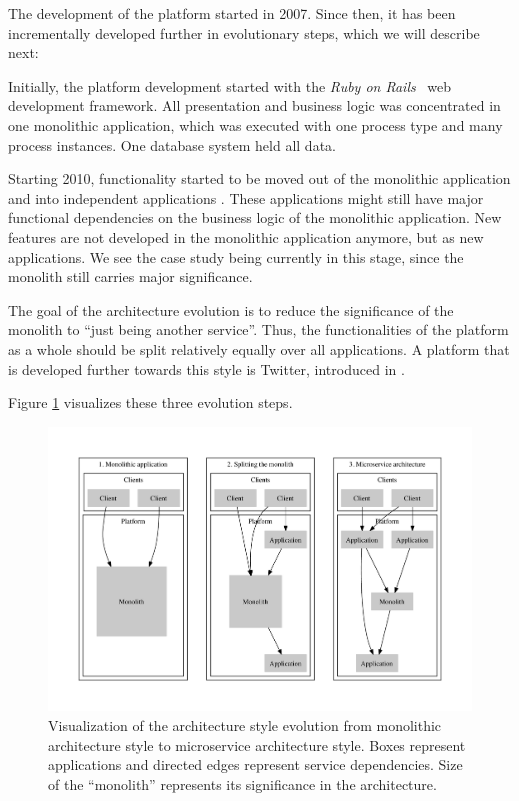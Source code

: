 The development of the platform started in 2007. Since then, it has been incrementally developed further in evolutionary steps, which we will describe next:
\begin{tdescription}
  \item[1. Monolithic application] Initially, the platform development started with the \emph{Ruby on Rails}~\cite{Rails} web development framework. All presentation and business logic was concentrated in one monolithic application, which was executed with one process type and many process instances. One database system held all data.
  \item[2. Splitting the monolithic application] Starting 2010, functionality started to be moved out of the monolithic application and into independent applications \cite{Phil2013Monolith} \cite{EvolutionTreadway}. These applications might still have major functional dependencies on the business logic of the monolithic application. New features are not developed in the monolithic application anymore, but as new applications. We see the case study being currently in this stage, since the monolith still carries major significance.
  \item[3. Full microservice architecture] The goal of the architecture evolution is to reduce the significance of the monolith to ``just being another service''. Thus, the functionalities of the platform as a whole should be split relatively equally over all applications. A platform that is developed further towards this style is Twitter, introduced in \cite{twittersoa}.
\end{tdescription}

Figure \ref{fig:evolution_example} visualizes these three evolution steps.

\begin{figure}[h!]
  \centering
  \includegraphics[width=\linewidth] {images/arch-evolution.pdf}
  \caption{Visualization of the architecture style evolution from monolithic architecture style to microservice architecture style. Boxes represent applications and directed edges represent service dependencies. Size of the ``monolith'' represents its significance in the architecture.}
  \label{fig:evolution_example}
\end{figure}

